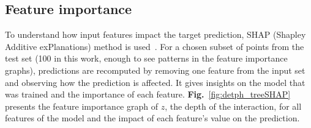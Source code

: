 \subsection{Feature importance}

To understand how input features impact the target prediction, SHAP (Shapley Additive exPlanations) method is used~\cite{lundberg2017}. For a chosen subset of points from the test set (100 in this work, enough to see patterns in the feature importance graphs), predictions are recomputed by removing one feature from the input set and observing how the prediction is affected. It gives insights on the model that was trained and the importance of each feature. \textbf{Fig.}~\ref{fig:detph_treeSHAP} presents the feature importance graph of $z$, the depth of the interaction, for all features of the model and the impact of each feature's value on the prediction.

